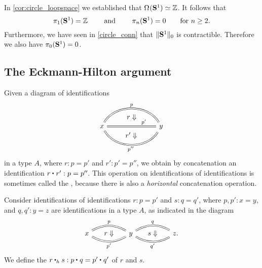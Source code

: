 \begin{eg}
In \cref{cor:circle_loopspace} we established that $\eqv{\loopspace{\sphere{1}}}{\Z}$. It follows that
\begin{equation*}
\pi_1(\sphere{1})=\Z \qquad\text{ and }\qquad\pi_n(\sphere{1})=0\qquad\text{for $n\geq 2$.}
\end{equation*}
Furthermore, we have seen in \cref{circle_conn} that $\trunc{0}{\sphere{1}}$ is contractible. 
Therefore we also have $\pi_0(\sphere{1})=0$.
\end{eg}

\subsection{The Eckmann-Hilton argument}

Given a diagram of identifications
\begin{equation*}
\begin{tikzcd}[column sep=7em]
x \arrow[r,equals,bend left=60,"p",""{name=A,below}] \arrow[r,equals,""{name=B},""{name=E,below},"{p'}"{near end}] \arrow[r,equals,bend right=60,"{p''}"{below},""{name=F,above}] \arrow[from=A,to=B,phantom,"r\Downarrow"] \arrow[from=E,to=F,phantom,"{r'\Downarrow}"] 
& y
\end{tikzcd}
\end{equation*}
in a type $A$, where $r:p=p'$ and $r':p'=p''$,
we obtain by concatenation an identification $\ct{r}{r'}:p=p''$. This operation on identifications of identifications is sometimes called the , because there is also a \emph{horizontal} concatenation operation.

\begin{defn}
Consider identifications of identifications $r:p=p'$ and $s:q=q'$, where $p,p':x=y$, and $q,q':y=z$ are identifications in a type $A$, as indicated in the diagram
\begin{equation*}
\begin{tikzcd}[column sep=huge]
x \arrow[r,equals,bend left=30,"p",""{name=A,below}] \arrow[r,equals,bend right=30,""{name=B,above},"{p'}"{below}] \arrow[from=A,to=B,phantom,"r\Downarrow"] & y \arrow[r,equals,bend left=30,"q",""{name=C,below}] \arrow[r,equals,bend right=30,""{name=D,above},"{q'}"{below}] \arrow[from=C,to=D,phantom,"s\Downarrow"] & z.
\end{tikzcd}
\end{equation*}
We define the  $\ct[h]{r}{s}:\ct{p}{q}=\ct{p'}{q'}$ of $r$ and $s$.
\end{defn}


